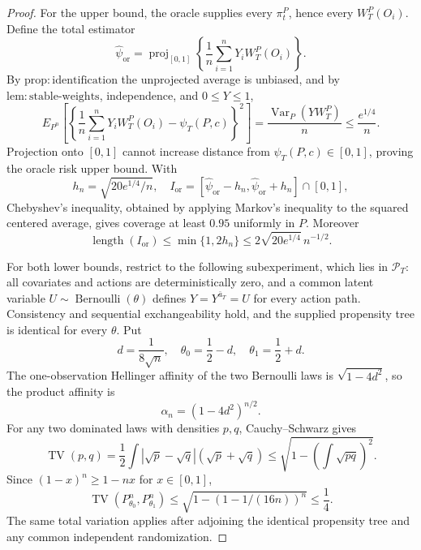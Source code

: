 \documentclass{article}
\begin{document}
\begin{proof}
For the upper bound, the oracle supplies every \(\pi_t^P\), hence every \(W_T^P(O_i)\).  Define the total estimator
\[
 \widehat\psi_{\mathrm{or}}
 =\operatorname{proj}_{[0,1]}\left\{\frac1n\sum_{i=1}^nY_iW_T^P(O_i)\right\}.
\]
By \(\mathrm{prop:identification}\) the unprojected average is unbiased, and by \(\mathrm{lem:stable\text{-}weights}\), independence, and \(0\leq Y\leq1\),
\[
 E_{P^n}\left[\left\{\frac1n\sum_{i=1}^nY_iW_T^P(O_i)-\psi_T(P,c)\right\}^2\right]
 =\frac{\operatorname{Var}_P(YW_T^P)}n
 \leq\frac{e^{1/4}}n.
\]
Projection onto \([0,1]\) cannot increase distance from \(\psi_T(P,c)\in[0,1]\), proving the oracle risk upper bound.  With
\[
 h_n=\sqrt{20e^{1/4}/n},\quad
 I_{\mathrm{or}}=[\widehat\psi_{\mathrm{or}}-h_n,\widehat\psi_{\mathrm{or}}+h_n]\cap[0,1],
\]
Chebyshev's inequality, obtained by applying Markov's inequality to the squared centered average, gives coverage at least \(0.95\) uniformly in \(P\).  Moreover
\[
 \operatorname{length}(I_{\mathrm{or}})\leq\min\{1,2h_n\}\leq 2\sqrt{20e^{1/4}}\,n^{-1/2}.
\]

For both lower bounds, restrict to the following subexperiment, which lies in \(\mathcal P_T\): all covariates and actions are deterministically zero, and a common latent variable \(U\sim\operatorname{Bernoulli}(\theta)\) defines \(Y=Y^{\bar a_T}=U\) for every action path.  Consistency and sequential exchangeability hold, and the supplied propensity tree is identical for every \(\theta\).  Put
\[
 d=\frac1{8\sqrt n},\quad \theta_0=\frac12-d,\quad\theta_1=\frac12+d.
\]
The one-observation Hellinger affinity of the two Bernoulli laws is \(\sqrt{1-4d^2}\), so the product affinity is
\[
 \alpha_n=(1-4d^2)^{n/2}.
\]
For any two dominated laws with densities \(p,q\), Cauchy--Schwarz gives
\[
 \operatorname{TV}(p,q)
 =\frac12\int|\sqrt p-\sqrt q|(\sqrt p+\sqrt q)
 \leq\sqrt{1-\left(\int\sqrt{pq}\right)^2}.
\]
Since \((1-x)^n\geq1-nx\) for \(x\in[0,1]\),
\[
 \operatorname{TV}(P_{\theta_0}^n,P_{\theta_1}^n)
 \leq\sqrt{1-(1-1/(16n))^n}\leq\frac14.
\]
The same total variation applies after adjoining the identical propensity tree and any common independent randomization.


\end{proof}
\end{document}
